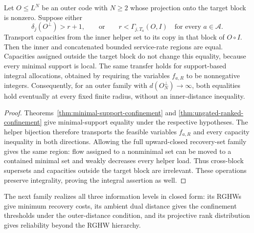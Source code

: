 \begin{corollary}
\label{cor:service-rate-transfer}
%
%
Let $O\leq L^N$ be an outer code with $N\geq2$ whose projection onto the
target block is nonzero.  Suppose either
\[
 \delta_j(O^\perp)>r+1,
 \qquad\text{or}\qquad
 r<\Gamma_{j,T_a}(O,I)\quad\text{for every }a\in\mathcal A.
\]
Transport capacities from the inner helper set to its copy in that block of
$O\circ I$.  Then the inner and concatenated bounded service-rate regions are
equal.  Capacities assigned outside the target block do not change this
equality, because every minimal support is local.  The same transfer holds
for support-based integral allocations, obtained by requiring the variables
$f_{a,R}$ to be nonnegative integers.  Consequently, for an outer family
with $d(O_N^\perp)\to\infty$, both equalities hold eventually at every
fixed finite radius, without an inner-distance inequality.
\end{corollary}

\begin{proof}
Theorems~\ref{thm:minimal-support-confinement} and
\ref{thm:ungated-ranked-confinement} give minimal-support equality under
the respective hypotheses.  The
helper bijection therefore transports the
feasible variables $f_{a,R}$ and every capacity inequality in both
directions.  Allowing the full upward-closed recovery-set family gives the
same region: flow assigned to a nonminimal set can be moved to a contained
minimal set and weakly decreases every helper load.  Thus cross-block
supersets and capacities outside the target block are irrelevant.  These
operations preserve integrality, proving the integral assertion as well.
%
%
\end{proof}

The next family realizes all three information levels in closed form: its
RGHWs give minimum recovery costs, its ambient dual distance gives the
confinement thresholds under the outer-distance condition, and its projective
rank distribution gives reliability
beyond the RGHW hierarchy.
